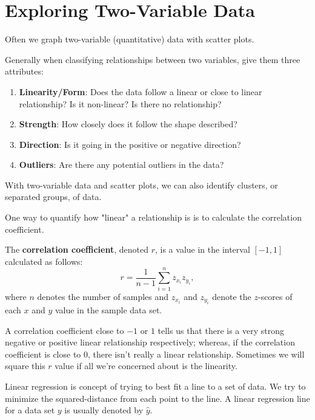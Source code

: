 \section{Exploring Two-Variable Data}

Often we graph two-variable (quantitative) data with scatter plots.

Generally when classifying relationships between two variables, give them three
attributes:
\begin{enumerate}
    \item \textbf{Linearity/Form}: Does the data follow a linear or close to linear relationship? Is it non-linear? Is there no relationship?
    \item \textbf{Strength}: How closely does it follow the shape described?
    \item \textbf{Direction}: Is it going in the positive or negative direction?
    \item \textbf{Outliers}: Are there any potential outliers in the data?
\end{enumerate}

With two-variable data and scatter plots, we can also identify clusters, or
separated groups, of data.

One way to quantify how "linear" a relationship is is to calculate the
correlation coefficient.

\begin{blackbox}
    \begin{definition}
        The \textbf{correlation coefficient}, denoted \( r \), is a value in the interval \( \left[-1, 1 \right] \) calculated as follows:
        \[
            r = \frac{1}{n - 1} \sum_{i = 1}^{n} z_{x_i} z_{y_i}
        ,\]
        where \( n \) denotes the number of samples and \( z_{x_i} \) and \(
        z_{y_i} \) denote the \( z \)-scores of each \( x \) and \( y \) value
        in the sample data set.
    \end{definition}
\end{blackbox}

A correlation coefficient close to \( -1 \) or \( 1 \) tells us that there is a
very strong negative or positive linear relationship respectively; whereas, if
the correlation coefficient is close to \( 0 \), there isn't really a linear
relationship. Sometimes we will square this \( r \) value if all we're
concerned about is the linearity.

Linear regression is concept of trying to best fit a line to a set of data. We
try to minimize the squared-distance from each point to the line. A linear regression line for a data set \( y \) is usually denoted by \( \hat{y} \).

